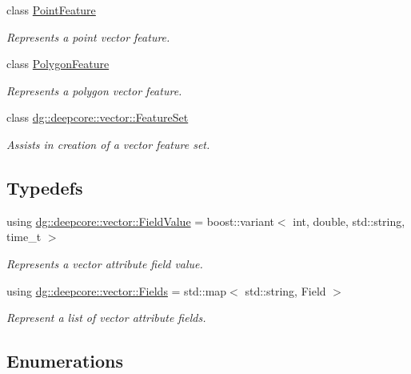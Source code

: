 \begin{DoxyCompactItemize}
class \hyperlink{class_point_feature}{Point\+Feature}
\begin{DoxyCompactList}\small\item\em Represents a point vector feature. \end{DoxyCompactList}\item 
class \hyperlink{class_polygon_feature}{Polygon\+Feature}
\begin{DoxyCompactList}\small\item\em Represents a polygon vector feature. \end{DoxyCompactList}\item 
class \hyperlink{classdg_1_1deepcore_1_1vector_1_1_feature_set}{dg\+::deepcore\+::vector\+::\+Feature\+Set}
\begin{DoxyCompactList}\small\item\em Assists in creation of a vector feature set. \end{DoxyCompactList}\end{DoxyCompactItemize}
\subsection*{Typedefs}
\begin{DoxyCompactItemize}
\item 
using \hyperlink{group___vector_module_ga4b8ce414fd5c655308a07474c35828c0}{dg\+::deepcore\+::vector\+::\+Field\+Value} = boost\+::variant$<$ int, double, std\+::string, time\+\_\+t $>$
\begin{DoxyCompactList}\small\item\em Represents a vector attribute field value. \end{DoxyCompactList}\item 
using \hyperlink{group___vector_module_gabeca0d4b0cbea4335ae890255ca59128}{dg\+::deepcore\+::vector\+::\+Fields} = std\+::map$<$ std\+::string, Field $>$
\begin{DoxyCompactList}\small\item\em Represent a list of vector attribute fields. \end{DoxyCompactList}\end{DoxyCompactItemize}
\subsection*{Enumerations}

